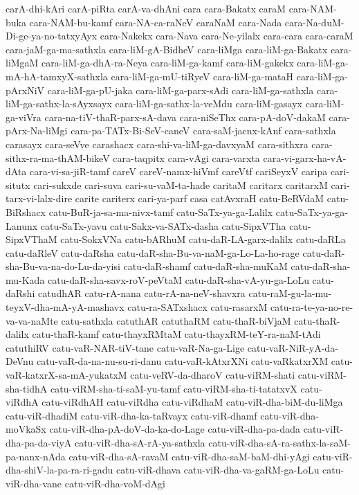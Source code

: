 {carA-dhi-kAri
carA-piRta
carA-va-dhAni
cara
cara-Bakatx
caraM
cara-NAM-buka
cara-NAM-bu-kamf
cara-NA-ca-raNeV
caraNaM
cara-Nada
cara-Na-duM-Di-ge-ya-no-tatxyAyx
cara-Nakekx
cara-Nava
cara-Ne-yilalx
cara-cara
cara-caraM
cara-jaM-ga-ma-sathxla
cara-liM-gA-BidheV
cara-liMga
cara-liM-ga-Bakatx
cara-liMgaM
cara-liM-ga-dhA-ra-Neya
cara-liM-ga-kamf
cara-liM-gakekx
cara-liM-ga-mA-hA-tamxyX-sathxla
cara-liM-ga-mU-tiRyeV
cara-liM-ga-mataH
cara-liM-ga-pArxNiV
cara-liM-ga-pU-jaka
cara-liM-ga-parx-sAdi
cara-liM-ga-sathxla
cara-liM-ga-sathx-la-sAyxsayx
cara-liM-ga-sathx-la-veMdu
cara-liM-gasayx
cara-liM-ga-viVra
cara-na-tiV-thaR-parx-sA-dava
cara-niSeThx
cara-pA-doV-dakaM
cara-pArx-Na-liMgi
cara-pa-TATx-Bi-SeV-caneV
cara-saM-jacnx-kAnf
cara-sathxla
carasayx
cara-seVve
carashacx
cara-shi-va-liM-ga-davxyaM
cara-sithxra
cara-sithx-ra-ma-thAM-bikeV
cara-taqpitx
cara-vAgi
cara-varxta
cara-vi-garx-ha-vA-dAta
cara-vi-sa-jiR-tamf
careV
careV-namx-hiVmf
careVtf
cariSeyxV
caripa
cari-situtx
cari-sukxde
cari-suva
cari-su-vaM-ta-hade
caritaM
caritarx
caritarxM
cari-tarx-vi-lalx-dire
carite
cariterx
cari-ya-parf
casa
catAvxraH
catu-BeRVdaM
catu-BiRshacx
catu-BuR-ja-sa-ma-nivx-tamf
catu-SaTx-ya-ga-Lalilx
catu-SaTx-ya-ga-Lanunx
catu-SaTx-yavu
catu-Sakx-va-SATx-dasha
catu-SipxVTha
catu-SipxVThaM
catu-SokxVNa
catu-bARhuM
catu-daR-LA-garx-dalilx
catu-daRLa
catu-daRleV
catu-daRsha
catu-daR-sha-Bu-va-naM-ga-Lo-La-ho-rage
catu-daR-sha-Bu-va-na-do-Lu-da-yisi
catu-daR-shamf
catu-daR-sha-muKaM
catu-daR-sha-mu-Kada
catu-daR-sha-savx-roV-peVtaM
catu-daR-sha-vA-yu-ga-LoLu
catu-daRshi
catudhAR
catu-rA-nana
catu-rA-na-neV-shavxra
catu-raM-gu-la-mu-teyxV-dha-mA-yA-mashavx
catu-ra-SATxshacx
catu-rasarxM
catu-ra-te-ya-no-re-va-va-naMte
catu-sathxla
catuthAR
catuthaRM
catu-thaR-biVjaM
catu-thaR-dalilx
catu-thaR-kamf
catu-thayxRMtaM
catu-thayxRM-teY-ra-naM-tAdi
catuthiRV
catu-vaR-NAR-tiV-tane
catu-vaR-Na-ga-Lige
catu-vaR-NiR-yA-da-DeVnu
catu-vaR-da-na-nu-su-ri-danu
catu-vaR-kAtxrXNi
catu-vaRkatxrXM
catu-vaR-katxrX-sa-mA-yukatxM
catu-veRV-da-dharoV
catu-viRM-shati
catu-viRM-sha-tidhA
catu-viRM-sha-ti-saM-yu-tamf
catu-viRM-sha-ti-tatatxvX
catu-viRdhA
catu-viRdhAH
catu-viRdha
catu-viRdhaM
catu-viR-dha-biM-du-liMga
catu-viR-dhadiM
catu-viR-dha-ka-taRvayx
catu-viR-dhamf
catu-viR-dha-moVkaSx
catu-viR-dha-pA-doV-da-ka-do-Lage
catu-viR-dha-pa-dada
catu-viR-dha-pa-da-viyA
catu-viR-dha-sA-rA-ya-sathxla
catu-viR-dha-sA-ra-sathx-la-saM-pa-nanx-nAda
catu-viR-dha-sA-ravaM
catu-viR-dha-saM-baM-dhi-yAgi
catu-viR-dha-shiV-la-pa-ra-ri-gadu
catu-viR-dhava
catu-viR-dha-va-gaRM-ga-LoLu
catu-viR-dha-vane
catu-viR-dha-voM-dAgi
}
